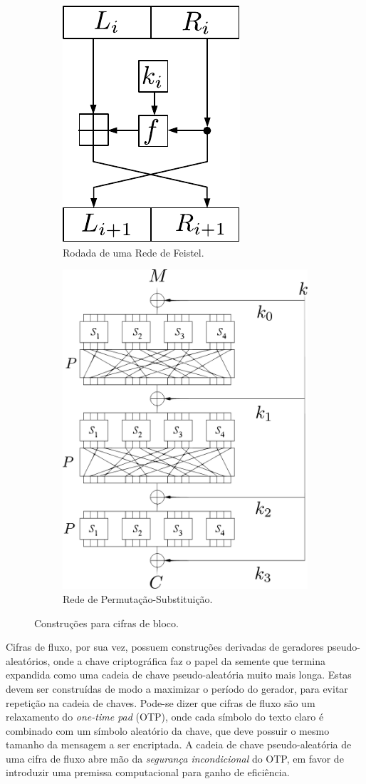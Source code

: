 \begin{figure}[h!]
\centering
\begin{subfigure}{.5\textwidth}
  \centering
  \includegraphics[width=.4\linewidth]{figures/feistel.pdf}
  \caption{Rodada de uma Rede de Feistel.}
  \label{fig:feistel}
\end{subfigure}%
\begin{subfigure}{.5\textwidth}
  \centering
  \includegraphics[width=.7\linewidth]{figures/spn.pdf}
  \caption{Rede de Permutação-Substituição.}
  \label{fig:spn}
\end{subfigure}
\caption{Construções para cifras de bloco.}
\label{fig:bloco}
\end{figure}

Cifras de fluxo, por sua vez, possuem construções derivadas de geradores pseudo-aleatórios, onde a chave criptográfica faz o papel da semente que termina expandida como uma cadeia de chave pseudo-aleatória muito mais longa. Estas devem ser construídas de modo a maximizar o período do gerador, para evitar repetição na cadeia de chaves. Pode-se dizer que cifras de fluxo são um relaxamento do \emph{one-time pad} (OTP), onde cada símbolo do texto claro é combinado com um símbolo aleatório da chave, que deve possuir o mesmo tamanho da mensagem a ser encriptada. A cadeia de chave pseudo-aleatória de uma cifra de fluxo abre mão da \emph{segurança incondicional} do OTP, em favor de introduzir uma premissa computacional para ganho de eficiência.

